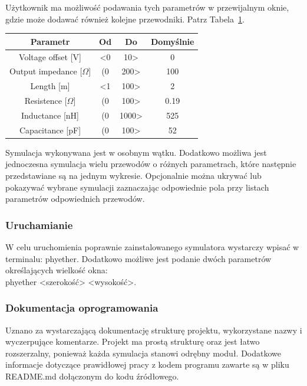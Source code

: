 Użytkownik ma możliwość podawania tych parametrów w przewijalnym oknie, gdzie może dodawać również kolejne przewodniki. Patrz Tabela~\ref{tab:parametry}.

\begin{table}[H]
    \centering
    \begin{tabular}{|c|c|c|c|}
        \hline
        \textbf{Parametr} & \textbf{Od} & \textbf{Do} & \textbf{Domyślnie} \\
        \hline
        Voltage offset [V] & <0 & 10> & 0 \\
        Output impedance [$\Omega$] & (0 & 200> & 100 \\
        Length [m] & <1 & 100> & 2 \\
        Resistence [$\Omega$] & (0 & 100> & 0.19 \\
        Inductance [nH] & (0 & 1000> & 525 \\
        Capacitance [pF] & (0 & 100> & 52 \\
        \hline
    \end{tabular}
    \label{tab:parametry}
\end{table}

Symulacja wykonywana jest w osobnym wątku. Dodatkowo możliwa jest jednoczesna symulacja wielu przewodów o różnych parametrach, które następnie przedstawiane są na jednym wykresie. Opcjonalnie można ukrywać lub pokazywać wybrane symulacji zaznaczając odpowiednie pola przy listach parametrów odpowiednich przewodów.

\subsubsection{Uruchamianie}
W celu uruchomienia poprawnie zainstalowanego symulatora wystarczy wpisać w terminalu: phyether. Dodatkowo możliwe jest podanie dwóch parametrów określających wielkość okna: \\ phyether <szerokość> <wysokość>.

\subsubsection{Dokumentacja oprogramowania}
Uznano za wystarczającą dokumentację strukturę projektu, wykorzystane nazwy i wyczerpujące komentarze. Projekt ma prostą strukturę oraz jest łatwo rozszerzalny, ponieważ każda symulacja stanowi odrębny moduł. Dodatkowe informacje dotyczące prawidłowej pracy z kodem programu zawarte są w pliku README.md dołączonym do kodu źródłowego.
